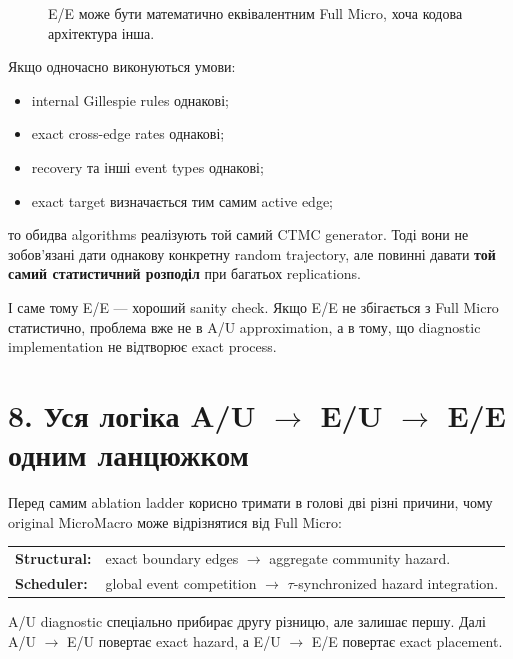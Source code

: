 \documentclass[11pt,a4paper]{article}
\begin{document}
\begin{figure}[h!]
\centering
{}
\caption{E/E може бути математично еквівалентним Full Micro, хоча кодова архітектура інша.}
\end{figure}

Якщо одночасно виконуються умови:
\begin{itemize}[nosep]
\item internal Gillespie rules однакові;
\item exact cross-edge rates однакові;
\item recovery та інші event types однакові;
\item exact target визначається тим самим active edge;
\end{itemize}
то обидва algorithms реалізують той самий CTMC generator. Тоді вони не зобов'язані дати однакову конкретну random trajectory, але повинні давати \textbf{той самий статистичний розподіл} при багатьох replications.

І саме тому E/E --- хороший sanity check. Якщо E/E не збігається з Full Micro статистично, проблема вже не в A/U approximation, а в тому, що diagnostic implementation не відтворює exact process.

\section*{8. Уся логіка A/U $\to$ E/U $\to$ E/E одним ланцюжком}

Перед самим ablation ladder корисно тримати в голові дві різні причини, чому original MicroMacro може відрізнятися від Full Micro:
\begin{center}
\begin{tabular}{>{\raggedright\arraybackslash}p{29mm} >{\raggedright\arraybackslash}p{112mm}}
\textbf{Structural:} & exact boundary edges $\to$ aggregate community hazard.\\[2pt]
\textbf{Scheduler:} & global event competition $\to$ $\tau$-synchronized hazard integration.
\end{tabular}
\end{center}
A/U diagnostic спеціально прибирає другу різницю, але залишає першу. Далі A/U $\to$ E/U повертає exact hazard, а E/U $\to$ E/E повертає exact placement.
\end{document}
